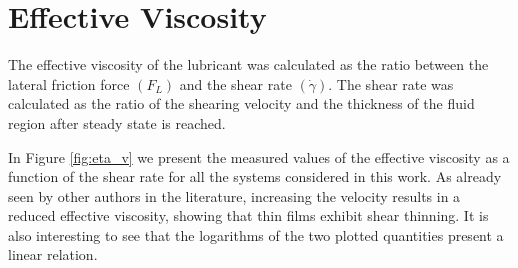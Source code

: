 \documentclass[5p]{elsarticle}
\begin{document}

\section{Effective Viscosity}

The effective viscosity of the lubricant was calculated as the ratio between the lateral friction force $\left(F_L\right)$ and the shear rate $\left(\dot{\gamma}\right)$. The shear rate was calculated as the ratio of the shearing velocity and the thickness of the fluid region after steady state is reached. 

In Figure \ref{fig:eta_v} we present the measured values of the effective viscosity as a function of the shear rate for all the systems considered in this work.   As already seen by other authors in the literature, increasing the velocity results in a reduced effective viscosity, showing that thin films exhibit shear thinning\cite{Sivebaek2012}. It is also interesting to see that the logarithms of the two plotted quantities present a linear relation.
\end{document}
